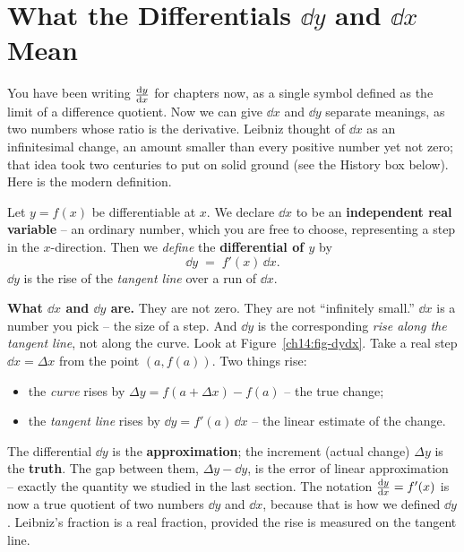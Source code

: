 \section{What the Differentials \texorpdfstring{$\dd y$}{dy} and \texorpdfstring{$\dd x$}{dx} Mean}
\label{ch14:differentials}

You have been writing $\frac{\mathrm{d} y}{\mathrm{d} x}$ for chapters now, as a single symbol defined as the
limit of a difference quotient. Now we can give $\dd x$ and $\dd y$ separate
meanings, as two numbers whose ratio is the derivative. Leibniz thought of $\dd x$
as an infinitesimal change, an amount smaller than every positive number yet not
zero; that idea took two centuries to put on solid ground (see the History box
below). Here is the modern definition.

\begin{definition}
\label{ch14:def-differentials}
Let $y=f(x)$ be differentiable at $x$. We declare $\dd x$ to be an
\textbf{independent real variable} -- an ordinary number, which you are free to
choose, representing a step in the $x$-direction. Then we \emph{define} the
\textbf{differential of $y$} by
\[
\dd y \;=\; f'(x)\,\dd x.
\]
$\dd y$ is the rise of the \emph{tangent line} over a run of $\dd x$.
\end{definition}

\begin{happeningbox}
\textbf{What $\dd x$ and $\dd y$ are.} They are not zero. They are not
``infinitely small.'' $\dd x$ is a number you pick -- the size of a step.
And $\dd y$ is the corresponding \emph{rise along the tangent line}, not along the
curve. Look at Figure~\ref{ch14:fig-dydx}. Take a real step $\dd x = \Delta x$
from the point $(a,f(a))$. Two things rise:
\begin{itemize}
\item the \emph{curve} rises by $\Delta y = f(a+\Delta x) - f(a)$ -- the true
change;
\item the \emph{tangent line} rises by $\dd y = f'(a)\,\dd x$ -- the linear
estimate of the change.
\end{itemize}
The differential $\dd y$ is the \textbf{approximation}; the increment (actual
change) $\Delta y$ is the \textbf{truth}. The gap between them, $\Delta y - \dd y$, is the error of
linear approximation -- exactly the quantity we studied in the last section. The
notation $\frac{\mathrm{d} y}{\mathrm{d} x}=f'(x)$ is now a true quotient of two numbers $\dd y$
and $\dd x$, because that is how we defined $\dd y$. Leibniz's fraction is a real
fraction, provided the rise is measured on the tangent line.
\end{happeningbox}

